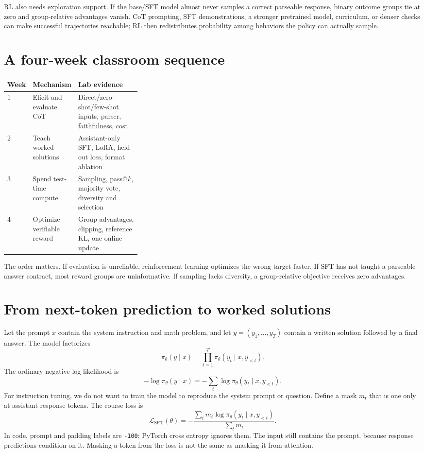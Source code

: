 \documentclass[11pt]{article}
\begin{document}
RL also needs exploration support.  If the base/SFT model almost never samples a
correct parseable response, binary outcome groups tie at zero and group-relative
advantages vanish.  CoT prompting, SFT demonstrations, a stronger pretrained
model, curriculum, or denser checks can make successful trajectories reachable;
RL then redistributes probability among behaviors the policy can actually
sample.

\section{A four-week classroom sequence}
\begin{center}
\begin{tabularx}{\linewidth}{p{0.09\linewidth}p{0.23\linewidth}X}
\toprule
Week & Mechanism & Lab evidence \\
\midrule
1 & Elicit and evaluate CoT & Direct/zero-shot/few-shot inputs, parser, faithfulness, cost \\
2 & Teach worked solutions & Assistant-only SFT, LoRA, held-out loss, format ablation \\
3 & Spend test-time compute & Sampling, pass@$k$, majority vote, diversity and selection \\
4 & Optimize verifiable reward & Group advantages, clipping, reference KL, one online update \\
\bottomrule
\end{tabularx}
\end{center}
The order matters. If evaluation is unreliable, reinforcement learning optimizes
the wrong target faster. If SFT has not taught a parseable answer contract, most
reward groups are uninformative. If sampling lacks diversity, a group-relative
objective receives zero advantages.

\section{From next-token prediction to worked solutions}
Let the prompt $x$ contain the system instruction and math problem, and let
$y=(y_1,\ldots,y_T)$ contain a written solution followed by a final answer. The
model factorizes
\[
\pi_\theta(y\mid x)=\prod_{t=1}^{T}\pi_\theta(y_t\mid x,y_{<t}).
\]
The ordinary negative log likelihood is
\[
-\log\pi_\theta(y\mid x)=-\sum_t\log\pi_\theta(y_t\mid x,y_{<t}).
\]
For instruction tuning, we do not want to train the model to reproduce the
system prompt or question. Define a mask $m_t$ that is one only at assistant
response tokens. The course loss is
\[
\mathcal L_{\mathrm{SFT}}(\theta)
=-\frac{\sum_t m_t\log\pi_\theta(y_t\mid x,y_{<t})}{\sum_t m_t}.
\]
In code, prompt and padding labels are \texttt{-100}; PyTorch cross entropy
ignores them. The input still contains the prompt, because response predictions
condition on it. Masking a token from the loss is not the same as masking it from
attention.
\end{document}
